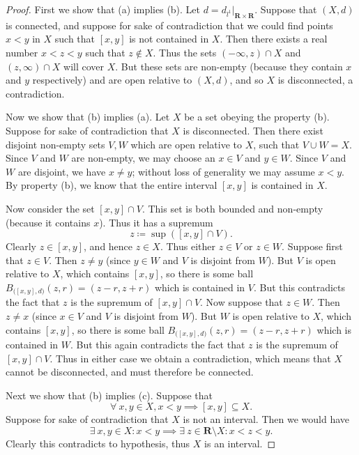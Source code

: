 \begin{proof}
    First we show that (a) implies (b).
    Let \(d = d_{l^1}|_{\mathbf{R} \times \mathbf{R}}\).
    Suppose that \((X, d)\) is connected, and suppose for sake of contradiction that we could find points \(x < y\) in \(X\) such that \([x, y]\) is not contained in \(X\).
    Then there exists a real number \(x < z < y\) such that \(z \notin X\).
    Thus the sets \((-\infty, z) \cap X\) and \((z, \infty) \cap X\) will cover \(X\).
    But these sets are non-empty (because they contain \(x\) and \(y\) respectively) and are open relative to \((X, d)\), and so \(X\) is disconnected, a contradiction.

    Now we show that (b) implies (a).
    Let \(X\) be a set obeying the property (b).
    Suppose for sake of contradiction that \(X\) is disconnected.
    Then there exist disjoint non-empty sets \(V , W\) which are open relative to \(X\), such that \(V \cup W = X\).
    Since \(V\) and \(W\) are non-empty, we may choose an \(x \in V\) and \(y \in W\).
    Since \(V\) and \(W\) are disjoint, we have \(x \neq y\);
    without loss of generality we may assume \(x < y\).
    By property (b), we know that the entire interval \([x, y]\) is contained in \(X\).

    Now consider the set \([x, y] \cap V\).
    This set is both bounded and non-empty (because it contains \(x\)).
    Thus it has a supremum
    \[
        z \coloneqq \sup([x, y] \cap V).
    \]
    Clearly \(z \in [x, y]\), and hence \(z \in X\).
    Thus either \(z \in V\) or \(z \in W\).
    Suppose first that \(z \in V\).
    Then \(z \neq y\) (since \(y \in W\) and \(V\) is disjoint from \(W\)).
    But \(V\) is open relative to \(X\), which contains \([x, y]\), so there is some ball \(B_{\big([x,y], d\big)}(z, r) = (z - r, z + r)\) which is contained in \(V\).
    But this contradicts the fact that \(z\) is the supremum of \([x, y] \cap V\).
    Now suppose that \(z \in W\).
    Then \(z \neq x\) (since \(x \in V\) and \(V\) is disjoint from \(W\)).
    But \(W\) is open relative to \(X\), which contains \([x, y]\), so there is some ball \(B_{\big([x,y], d\big)}(z, r) = (z - r, z + r)\) which is contained in \(W\).
    But this again contradicts the fact that \(z\) is the supremum of \([x, y] \cap V\).
    Thus in either case we obtain a contradiction, which means that \(X\) cannot be disconnected, and must therefore be connected.

    Next we show that (b) implies (c).
    Suppose that
    \[
        \forall\ x, y \in X, x < y \implies [x, y] \subseteq X.
    \]
    Suppose for sake of contradiction that \(X\) is not an interval.
    Then we would have
    \[
        \exists\ x, y \in X : x < y \implies \exists\ z \in \mathbf{R} \setminus X : x < z < y.
    \]
    Clearly this contradicts to hypothesis, thus \(X\) is an interval.


\end{proof}

